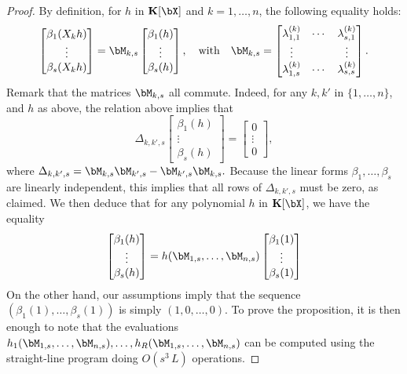 \documentclass[12pt]{article}
\begin{document}
\begin{proof}
  By definition, for $h$ in $\KK[\bX]$ and $k=1,\dots,n$, the following equality
  holds:
$$
  \begin{bmatrix}
    \beta_1(X_k h)\\
    \vdots\\
    \beta_s(X_k h)
  \end{bmatrix}=
\bM_{k,s}
  \begin{bmatrix}
    \beta_1(h)\\
    \vdots\\
    \beta_s(h)
  \end{bmatrix},
\quad\text{with}\quad
\bM_{k,s}= \begin{bmatrix}
    \lambda^{(k)}_{1,1} & \cdots & \lambda^{(k)}_{s,1}\\
    \vdots && \vdots \\
    \lambda^{(k)}_{1,s} & \cdots & \lambda^{(k)}_{s,s}
  \end{bmatrix}.
$$ 
 Remark that the matrices $\bM_{k,s}$ all commute. Indeed, 
for any $k,k'$ in $\{1,\dots,n\}$, and $h$ as above, the relation above implies
that 
$$
\Delta_{k,k',s}
  \begin{bmatrix}
    \beta_1(h)\\
    \vdots\\
    \beta_s(h)
  \end{bmatrix} =
  \begin{bmatrix}
0\\ \vdots \\ 0 
  \end{bmatrix},
$$
where $\Delta_{k,k',s} = \bM_{k,s}\bM_{k',s}-\bM_{k',s}\bM_{k,s}.$ Because 
the linear forms $\beta_1,\dots,\beta_s$ are linearly independent, this implies
that all rows of $\Delta_{k,k',s}$ must be zero, as claimed.
We then deduce that for any polynomial $h$ in $\KK[\bX]$, we have
the equality
$$  \begin{bmatrix}
    \beta_1(h)\\
    \vdots\\
    \beta_s(h)
  \end{bmatrix} =
h(\bM_{1,s},\dots,\bM_{n,s})   \begin{bmatrix}
    \beta_1(1)\\
    \vdots\\
    \beta_s(1)
  \end{bmatrix} $$ On the other hand, our assumptions imply that the
  sequence $(\beta_1(1),\dots,\beta_s(1))$ is simply $(1,0,\dots,0)$.
  To prove the proposition, it is then enough to note that the evaluations \sloppy
  $h_1(\bM_{1,s},\dots,\bM_{n,s}),\dots,h_R(\bM_{1,s},\dots,\bM_{n,s})$
  can be computed using the straight-line program doing
  $O(s^3\,L)$ operations.
\end{proof}
\end{document}

